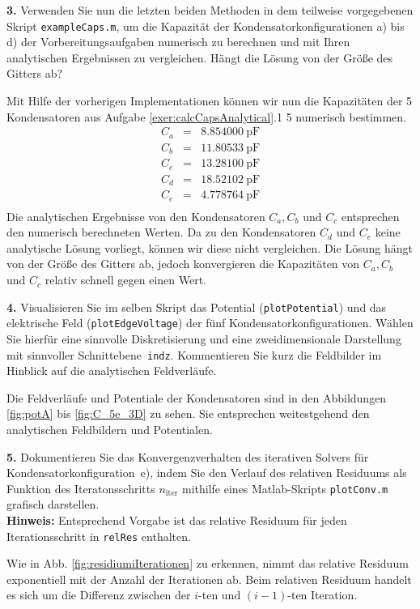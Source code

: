 \documentclass[Protokollheft.tex]{subfiles}
\begin{document}
\begin{framed}
	\noindent \textbf{3.} Verwenden Sie nun die letzten beiden Methoden in dem teilweise vorgegebenen Skript \lstinline{exampleCaps.m}, um
die Kapazität der Kondensatorkonfigurationen a) bis d) der Vorbereitungsaufgaben numerisch zu berechnen und mit Ihren analytischen Ergebnissen zu vergleichen. Hängt die Lösung von der Größe des Gitters ab?\label{exer:calcCapNumerically}
\end{framed}
\noindent
Mit Hilfe der vorherigen Implementationen können wir nun die Kapazitäten der 5 Kondensatoren aus Aufgabe \ref{exer:calcCapsAnalytical}.1 5 numerisch bestimmen.
\begin{eqnarray*}
C_a &=& 8.854000\ \text{pF}\\
C_b &=& 11.80533\ \text{pF}\\
C_c &=& 13.28100\ \text{pF}\\
C_d &=& 18.52102\ \text{pF}\\
C_e &=& 4.778764\ \text{pF}\\
\end{eqnarray*}
\noindent
Die analytischen Ergebnisse von den Kondensatoren $C_a, C_b$ und $C_c$ entsprechen den numerisch berechneten Werten. Da zu den Kondensatoren $C_d$ und $C_e$ keine analytische Lösung vorliegt, können wir diese nicht vergleichen. Die Lösung hängt von der Größe des Gitters ab, jedoch konvergieren die Kapazitäten von $C_a, C_b$ und $C_c$ relativ schnell gegen einen Wert. 
\begin{framed}
	\noindent \textbf{4.} Visualisieren Sie im selben Skript das Potential (\lstinline{plotPotential}) und das elektrische Feld (\lstinline{plotEdgeVoltage})
der fünf Kondensatorkonfigurationen. Wählen Sie hierfür eine sinnvolle Diskretisierung und eine zweidimensionale Darstellung mit sinnvoller Schnittebene~\lstinline{indz}. Kommentieren Sie kurz die Feldbilder im Hinblick auf die analytischen Feldverläufe.\label{exer:visualizeCapField}
\end{framed}
\noindent
Die Feldverläufe und Potentiale der Kondensatoren sind in den Abbildungen \ref{fig:potA} bis \ref{fig:C_5e_3D} zu sehen. Sie entsprechen weitestgehend den analytischen Feldbildern und Potentialen.

\begin{framed}
	\noindent \textbf{5.}   Dokumentieren Sie das Konvergenzverhalten des iterativen Solvers für Kondensatorkonfiguration~e), indem Sie
den Verlauf des relativen Residuums als Funktion des Iteratonsschritts $n_\text{iter}$ mithilfe eines Matlab-Skripts \lstinline{plotConv.m} grafisch darstellen.\\
{\textbf{Hinweis:}} Entsprechend Vorgabe ist das relative Residuum für jeden Iterationsschritt in \lstinline{relRes} enthalten.\label{exer:plotCapConvSolver}
\end{framed}
\noindent
Wie in Abb. \ref{fig:residiumiIterationen} zu erkennen, nimmt das relative Residuum exponentiell mit der Anzahl der Iterationen ab. 
Beim relativen Residuum handelt es sich um die Differenz zwischen der $i$-ten und $(i-1)$-ten Iteration. 
\end{document}
